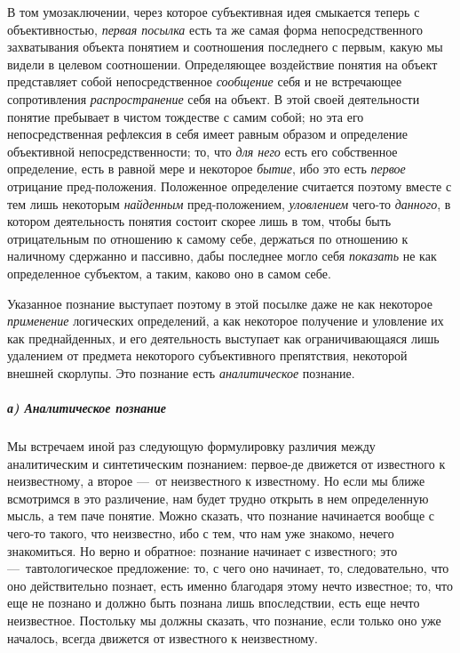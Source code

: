 \documentclass[twoside]{article}
\begin{document}
{В том умозаключении, через которое субъективная идея смыкается
теперь с объективностью, {\em первая
посылка} есть та же самая форма непосредственного
захватывания объекта понятием и соотношения последнего с первым, какую мы
видели в целевом соотношении. Определяющее воздействие понятия на объект
представляет собой непосредственное
{\em сообщение} себя и не
встречающее сопротивления
{\em распространение}
себя на объект. В этой своей деятельности понятие пребывает в
чистом тождестве с самим собой; но эта его непосредственная рефлексия в
себя имеет равным образом и определение объективной непосредственности; то,
что {\em для него} есть
его собственное определение, есть в равной мере и некоторое
{\em бытие}, ибо это есть
{\em первое} отрицание
пред-положения. Положенное определение считается поэтому вместе
с тем лишь некоторым {\em найденным}
пред-положением,
{\em уловлением} чего-то
{\em данного}, в котором
деятельность понятия состоит скорее лишь в том, чтобы быть отрицательным по
отношению к самому себе, держаться по отношению к наличному сдержанно и
пассивно, дабы последнее могло себя
{\em показать} не как
определенное субъектом, а таким, каково оно в самом себе.

Указанное познание выступает поэтому в этой посылке даже не
как некоторое {\em применение}
логических определений, а как некоторое получение и уловление
их как преднайденных, и его деятельность выступает как ограничивающаяся
лишь удалением от предмета некоторого субъективного препятствия, некоторой
внешней скорлупы. Это познание есть
{\em аналитическое}
познание.

\subparagraph[а) Аналитическое познание]{а) Аналитическое познание}
Мы встречаем иной раз следующую формулировку различия между
аналитическим и синтетическим познанием: первое-де движется от известного к
неизвестному, а второе —~от неизвестного к известному. Но
если мы ближе всмотримся в это различение, нам будет трудно открыть в нем
определенную мысль, а тем паче понятие. Можно сказать, что познание
начинается вообще с чего-то такого, что неизвестно, ибо с тем, что нам уже
знакомо, нечего знакомиться. Но верно и обратное: познание начинает с
известного; это —~тавтологическое предложение: то, с чего
оно начинает, то, следовательно, что оно действительно познает, есть именно
благодаря этому нечто известное; то, что еще не познано и должно быть
познана лишь впоследствии, есть еще нечто неизвестное. Постольку мы
должны сказать, что познание, если только оно уже началось,
всегда движется от известного к неизвестному.

}
\end{document}
